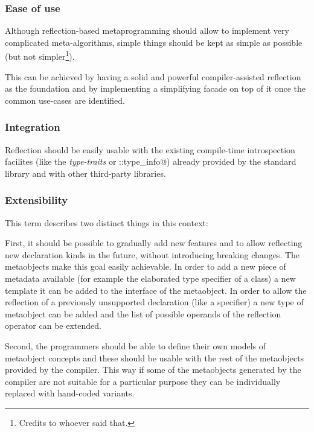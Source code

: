 \subsubsection{Ease of use}
\label{design-ease-of-use}

Although reflection-based metaprogramming should allow to implement very
complicated meta-algorithms, simple things should be kept as simple as possible
(but not simpler\footnote{Credits to whoever said that.}).

This can be achieved by having a solid and powerful compiler-assisted reflection
as the foundation and by implementing a simplifying facade on top of it once
the common use-cases are identified.

\subsubsection{Integration}
\label{design-integration}

Reflection should be easily
usable with the existing compile-time introspection facilites (like the
{\em type-traits} or \verb@std::type_info@)
already provided by the standard library and with other third-party libraries.

\subsubsection{Extensibility}
\label{design-extensibility}

This term describes two distinct things in this context:

First, it should be possible to gradually add new features and to allow
reflecting new declaration kinds
in the future, without introducing breaking changes. The metaobjects make this
goal easily achievable. In order to add a new piece of metadata available
(for example the elaborated type specifier of a class) a new template 
it can be added to the interface of the metaobject. In order to allow the reflection
of a previously unsupported declaration (like a specifier) a new type of metaobject
can be added and the list of possible operands of the reflection operator
can be extended.

Second, the programmers should be able to define their own models of metaobject concepts
and these should be usable with the rest of the metaobjects provided by the
compiler. This way if some of the metaobjects generated by the compiler are not
suitable for a particular purpose they can be individually replaced with
hand-coded variants.



